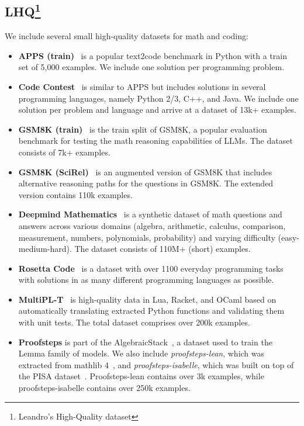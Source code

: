 \documentclass[10pt]{article} %
\begin{document}
\subsection{LHQ\protect\footnote{Leandro's High-Quality dataset}}\label{sec:source_lhq}
We include several small high-quality datasets for math and coding:
\begin{itemize}
    \item \textbf{APPS (train)}~\citep{hendrycksapps2021} is a popular text2code benchmark in Python with a train set of 5,000 examples. We include one solution per programming problem. 
    \item \textbf{Code Contest}~\citep{doi:10.1126/science.abq1158} is similar to APPS but includes solutions in several programming languages, namely Python 2/3, C++, and Java. We include one solution per problem and language and arrive at a dataset of 13k+ examples. 
    \item \textbf{GSM8K (train)}~\citep{cobbe2021gsm8k} is the train split of GSM8K, a popular evaluation benchmark for testing the math reasoning capabilities of LLMs. The dataset consists of 7k+ examples. 
    \item \textbf{GSM8K (SciRel)}~\citep{yuan2023scaling} is an augmented version of GSM8K that includes alternative reasoning paths for the questions in GSM8K. The extended version contains 110k examples. 
    \item \textbf{Deepmind Mathematics}~\citep{saxton2019analysing} is a synthetic dataset of math questions and answers across various domains (algebra, arithmetic, calculus, comparison, measurement, numbers, polynomials, probability) and varying difficulty (easy-medium-hard). The dataset consists of 110M+ (short) examples. 
    \item \textbf{Rosetta Code}~\citep{rosetta-code,nanz2015comparative} is a dataset with over 1100 everyday programming tasks with solutions in as many different programming languages as possible. 
    \item \textbf{MultiPL-T}~\citep{cassano2023knowledge} is high-quality data in Lua, Racket, and OCaml based on automatically translating extracted Python functions and validating them with unit tests. The total dataset comprises over 200k examples. 
    \item \textbf{Proofsteps} is part of the AlgebraicStack~\citep{azerbayev2023llemma}, a dataset used to train the Lemma family of models. We also include \emph{proofsteps-lean}, which was extracted from mathlib 4~\citep{The_mathlib_Community_2020}, and \emph{proofsteps-isabelle}, which was built on top of the PISA dataset~\citep{jiang2021lisa}. Proofsteps-lean contains over 3k examples, while proofsteps-isabelle contains over 250k examples. 
\end{itemize}
\end{document}
